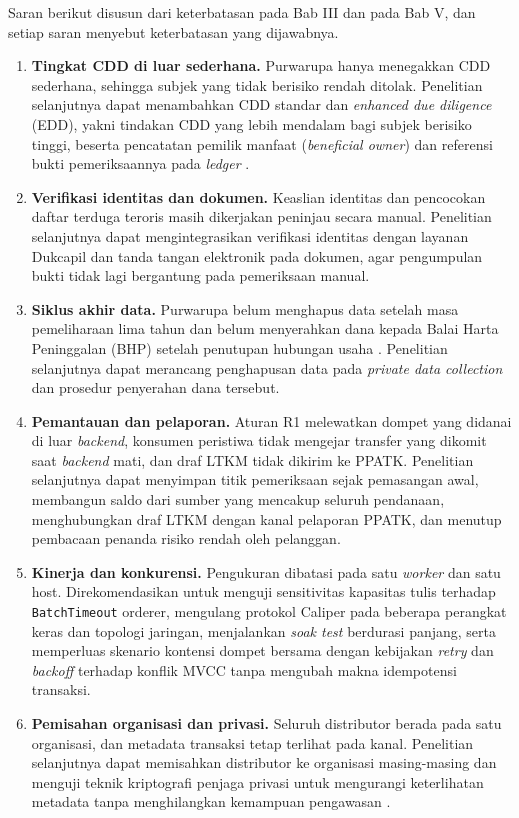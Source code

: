 Saran berikut disusun dari keterbatasan pada Bab III dan pada Bab V, dan setiap saran menyebut keterbatasan yang dijawabnya.
\begin{enumerate}
    \item \textbf{Tingkat CDD di luar sederhana.} Purwarupa hanya menegakkan CDD sederhana, sehingga subjek yang tidak berisiko rendah ditolak. Penelitian selanjutnya dapat menambahkan CDD standar dan \textit{enhanced due diligence} (EDD), yakni tindakan CDD yang lebih mendalam bagi subjek berisiko tinggi, beserta pencatatan pemilik manfaat (\textit{beneficial owner}) dan referensi bukti pemeriksaannya pada \textit{ledger} \cite{ojk2023pojk8, bi2023pedoman}.
    \item \textbf{Verifikasi identitas dan dokumen.} Keaslian identitas dan pencocokan daftar terduga teroris masih dikerjakan peninjau secara manual. Penelitian selanjutnya dapat mengintegrasikan verifikasi identitas dengan layanan Dukcapil dan tanda tangan elektronik pada dokumen, agar pengumpulan bukti tidak lagi bergantung pada pemeriksaan manual.
    \item \textbf{Siklus akhir data.} Purwarupa belum menghapus data setelah masa pemeliharaan lima tahun dan belum menyerahkan dana kepada Balai Harta Peninggalan (BHP) setelah penutupan hubungan usaha \cite[hlm.~40 dan 52]{bi2023pedoman}. Penelitian selanjutnya dapat merancang penghapusan data pada \textit{private data collection} dan prosedur penyerahan dana tersebut.
    \item \textbf{Pemantauan dan pelaporan.} Aturan R1 melewatkan dompet yang didanai di luar \textit{backend}, konsumen peristiwa tidak mengejar transfer yang dikomit saat \textit{backend} mati, dan draf LTKM tidak dikirim ke PPATK. Penelitian selanjutnya dapat menyimpan titik pemeriksaan sejak pemasangan awal, membangun saldo dari sumber yang mencakup seluruh pendanaan, menghubungkan draf LTKM dengan kanal pelaporan PPATK, dan menutup pembacaan penanda risiko rendah oleh pelanggan.
    \item \textbf{Kinerja dan konkurensi.} Pengukuran dibatasi pada satu \textit{worker} dan satu host. Direkomendasikan untuk menguji sensitivitas kapasitas tulis terhadap \texttt{BatchTimeout} orderer, mengulang protokol Caliper pada beberapa perangkat keras dan topologi jaringan, menjalankan \textit{soak test} berdurasi panjang, serta memperluas skenario kontensi dompet bersama dengan kebijakan \textit{retry} dan \textit{backoff} terhadap konflik MVCC tanpa mengubah makna idempotensi transaksi.
    \item \textbf{Pemisahan organisasi dan privasi.} Seluruh distributor berada pada satu organisasi, dan metadata transaksi tetap terlihat pada kanal. Penelitian selanjutnya dapat memisahkan distributor ke organisasi masing-masing dan menguji teknik kriptografi penjaga privasi untuk mengurangi keterlihatan metadata tanpa menghilangkan kemampuan pengawasan \cite{Pocher2022Privacy, Soana2024Central, Said2026Designing}.

\end{enumerate}

